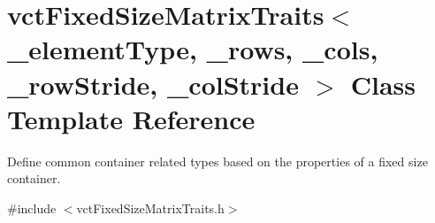 \hypertarget{classvct_fixed_size_matrix_traits}{\section{vct\-Fixed\-Size\-Matrix\-Traits$<$ \-\_\-element\-Type, \-\_\-rows, \-\_\-cols, \-\_\-row\-Stride, \-\_\-col\-Stride $>$ Class Template Reference}
\label{classvct_fixed_size_matrix_traits}
}


Define common container related types based on the properties of a fixed size container.  




{\ttfamily \#include $<$vct\-Fixed\-Size\-Matrix\-Traits.\-h$>$}


